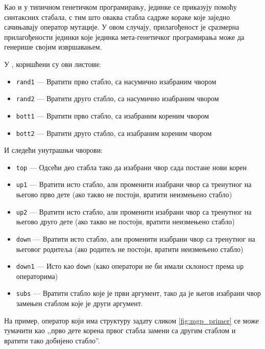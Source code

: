 \documentclass[a4paper]{article}
\begin{document}
Као и у типичном генетичком програмирању, јединке се приказују помоћу синтаксних стабала, с тим што оваква стабла садрже кораке које заједно сачињавају оператор мутације. У овом случају, прилагођеност је сразмерна прилагођености јединки које јединка мета-генетичког програмирања може да генерише својим извршавањем. 


У \cite{edmonds2001meta}, коришћени су ови листови:
\begin{itemize}
    \item \texttt{rand1} — Вратити прво стабло, са насумично изабраним чвором
    \item \texttt{rand2} — Вратити друго стабло, са насумично изабраним чвором
    \item \texttt{bott1} — Вратити прво стабло, са изабраним кореним чвором
    \item \texttt{bott2} — Вратити друго стабло, са изабраним кореним чвором
\end{itemize}

И следећи унутрашњи чворови:

\begin{itemize}
    \item \texttt{top} — Одсећи део стабла тако да изабрани чвор сада постане нови корен
    \item \texttt{up1} — Вратити исто стабло, али променити изабрани чвор са тренутног на његово прво дете (ако такво не постоји, вратити неизмењено стабло)
    \item \texttt{up2} — Вратити исто стабло, али променити изабрани чвор са тренутног на његово друго дете (ако такво не постоји, вратити неизмењено стабло)
    \item \texttt{down} — Вратити исто стабло, али променити изабрани чвор са тренутног на његовог родитеља (ако родитељ не постоји, вратити неизмењено стабло) 
    \item \texttt{down1} — Исто као \texttt{down} (како оператори не би имали склоност према \texttt{up} операторима)
    \item \texttt{subs} — Вратити стабло које је први аргумент, тако да је његов изабрани чвор замењен стаблом које је други аргумент.
\end{itemize}

На пример, оператор који има структуру задату сликом \ref{fig:mgp_primer} се може тумачити као ,,прво дете корена првог стабла замени са другим стаблом и вратити тако добијено стабло''.
\end{document}
